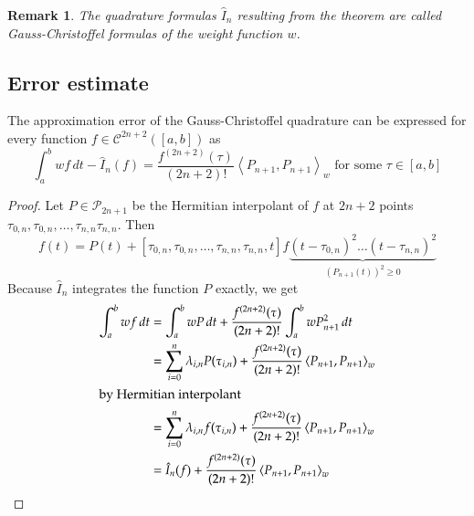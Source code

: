 \documentclass[a4paper]{article}
\numberwithin{lecref}{section}
\theoremstyle{break}
\newtheorem*{Remark}{Remark}
\newcommand{\IP}[2]{\left\langle#1, #2\right\rangle}
\begin{document}
\begin{Remark}
  The quadrature formulas $\hat{I}_n$ resulting from the theorem are called Gauss-Christoffel formulas of the weight function $w$.
\end{Remark}

\subsection{Error estimate}
\begin{theorem}
  \label{theorem:5-14}
  The approximation error of the Gauss-Christoffel quadrature can be expressed for every function $f \in \mathcal C^{2n+2}([a,b])$ as
  \[ \int_a^b w f \, dt - \hat{I}_n(f) = \frac{f^{(2n+2)}(\tau)}{(2n+2)!} \IP{P_{n+1}}{P_{n+1}}_w \text{ for some } \tau \in [a,b] \]
\end{theorem}

\begin{proof}
  Let $P \in \mathcal P_{2n+1}$ be the Hermitian interpolant of $f$ at $2n+2$ points $\tau_{0,n}, \tau_{0,n}, \dots, \tau_{n,n} \tau_{n,n}$. Then
  \[ f(t) = P(t) + [\tau_{0,n}, \tau_{0,n}, \dots, \tau_{n,n}, \tau_{n,n}, t] f \underbrace{(t - \tau_{0,n})^2 \dots (t - \tau_{n,n})^2}_{(P_{n+1}(t))^2 \geq 0} \]
  Because $\hat{I}_n$ integrates the function $P$ exactly, we get
  \begin{align*}
    \int_a^b w f \, dt
      &= \int_a^b w P \, dt + \frac{f^{(2n+2)}(\tau)}{(2n+2)!} \int_a^b w P_{n+1}^2 \, dt \\
      &= \sum_{i=0}^n \lambda_{i,n} P(\tau_{i,n}) + \frac{f^{(2n+2)}(\tau)}{(2n+2)!} \IP{P_{n+1}}{P_{n+1}}_w \\
    \intertext{by Hermitian interpolant}
      &= \sum_{i=0}^n \lambda_{i,n} f(\tau_{i,n}) + \frac{f^{(2n+2)}(\tau)}{(2n+2)!} \IP{P_{n+1}}{P_{n+1}}_w \\
      &= \hat{I}_n(f) + \frac{f^{(2n+2)}(\tau)}{(2n+2)!} \IP{P_{n+1}}{P_{n+1}}_w
  \end{align*}
\end{proof}
\end{document}
